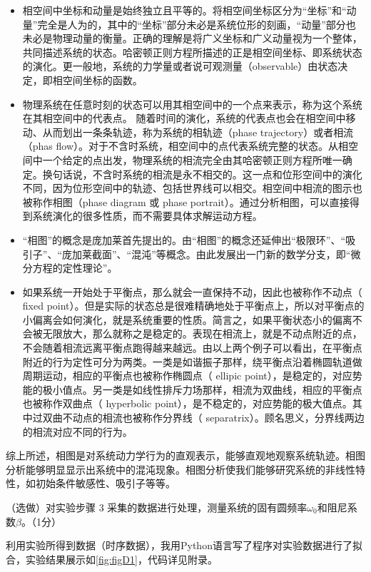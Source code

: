 \documentclass[dvipsnames, svgnames,a4paper,11pt]{article}
\begin{document}
\begin{itemize}
		\begin{itemize}
			\item 相空间中坐标和动量是始终独立且平等的。将相空间坐标区分为“坐标”和“动量”完全是人为的，其中的“坐标”部分未必是系统位形的刻画，“动量”部分也未必是物理动量的衡量。正确的理解是将广义坐标和广义动量视为一个整体，共同描述系统的状态。哈密顿正则方程所描述的正是相空间坐标、即系统状态的演化。更一般地，系统的力学量或者说可观测量（observable）由状态决定，即相空间坐标的函数。
			\item 物理系统在任意时刻的状态可以用其相空间中的一个点来表示，称为这个系统在其相空间中的代表点。
			随着时间的演化，系统的代表点也会在相空间中移动、从而划出一条条轨迹，称为系统的相轨迹（phase trajectory）或者相流（phas flow）。对于不含时系统，相空间中的点代表系统完整的状态。从相空间中一个给定的点出发，物理系统的相流完全由其哈密顿正则方程所唯一确定。换句话说，不含时系统的相流是永不相交的。这一点和位形空间中的演化不同，因为位形空间中的轨迹、包括世界线可以相交。相空间中相流的图示也被称作相图（phase diagram 或 phase portrait）。通过分析相图，可以直接得到系统演化的很多性质，而不需要具体求解运动方程。
			\item “相图”的概念是庞加莱首先提出的。由“相图”的概念还延伸出“极限环”、“吸引子”、“庞加莱截面”、“混沌”等概念。由此发展出一门新的数学分支，即“微分方程的定性理论”。
			\item 如果系统一开始处于平衡点，那么就会一直保持不动，因此也被称作不动点（ fixed point）。但是实际的状态总是很难精确地处于平衡点上，所以对平衡点的小偏离会如何演化，就是系统重要的性质。简言之，如果平衡状态小的偏离不会被无限放大，那么就称之是稳定的。表现在相流上，就是不动点附近的点，不会随着相流远离平衡点跑得越来越远。由以上两个例子可以看出，在平衡点附近的行为定性可分为两类。一类是如谐振子那样，绕平衡点沿着椭圆轨道做周期运动，相应的平衡点也被称作椭圆点（ ellipic point），是稳定的，对应势能的极小值点。另一类是如线性排斥力场那样，相流为双曲线，相应的平衡点也被称作双曲点（ hyperbolic point），是不稳定的，对应势能的极大值点。其中过双曲不动点的相流也被称作分界线（ separatrix）。顾名思义，分界线两边的相流对应不同的行为。
		\end{itemize}
		
		综上所述，相图是对系统动力学行为的直观表示，能够直观地观察系统轨迹。相图分析能够明显显示出系统中的混沌现象。相图分析使我们能够研究系统的非线性特性，如初始条件敏感性、吸引子等等。		
	\end{itemize}
		
	\begin{question}
		（选做）对实验步骤 3 采集的数据进行处理，测量系统的固有圆频率$\omega_0$和阻尼系数$\beta$。（1分）
	\end{question}
	利用实验所得到数据（时序数据），我用Python语言写了程序对实验数据进行了拟合，实验结果展示如\cref{fig:figD1}，代码详见附录。
	
\end{document}
